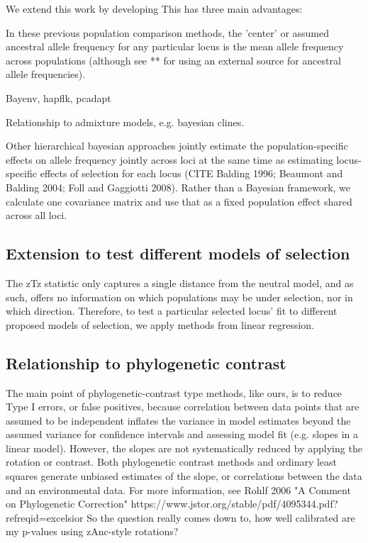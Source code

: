 \documentclass[12pt]{report}
\begin{document}
We extend this work by developing 
This has three main advantages:

In these previous population comparison methods, the 'center' or assumed ancestral allele frequency for any particular locus is the mean allele frequency across populations (although see ** for using an external source for ancestral allele frequencies). 

Bayenv, hapflk, pcadapt

Relationship to admixture models, e.g. bayesian clines.

Other hierarchical bayesian approaches jointly estimate the population-specific effects on allele frequency jointly across loci at the same time as estimating locus-specific effects of selection for each locus (CITE Balding 1996; Beaumont and Balding 2004; Foll and Gaggiotti 2008). Rather than a Bayesian framework, we calculate one covariance matrix and use that as a fixed population effect shared across all loci.

\subsection{Extension to test different models of selection}

The zTz statistic only captures a single distance from the neutral model, and as such, offers no information on which populations may be under selection, nor in which direction. Therefore, to test a particular selected locus' fit to different proposed models of selection, we apply methods from linear regression. 



\subsection{Relationship to phylogenetic contrast}
The main point of phylogenetic-contrast type methods, like ours, is to reduce Type I errors, or false positives, because correlation between data points that are assumed to be independent inflates the variance in model estimates beyond the assumed variance for confidence intervals and assessing model fit (e.g. slopes in a linear model). However, the slopes are not systematically reduced by applying the rotation or contrast. Both phylogenetic contrast methods and ordinary least squares generate unbiased estimates of the slope, or correlations between the data and an environmental data. For more information, see Rohlf 2006 "A Comment on Phylogenetic Correction" https://www.jstor.org/stable/pdf/4095344.pdf?refreqid=excelsior%
So the question really comes down to, how well calibrated are my p-values using zAnc-style rotations?
\end{document}
